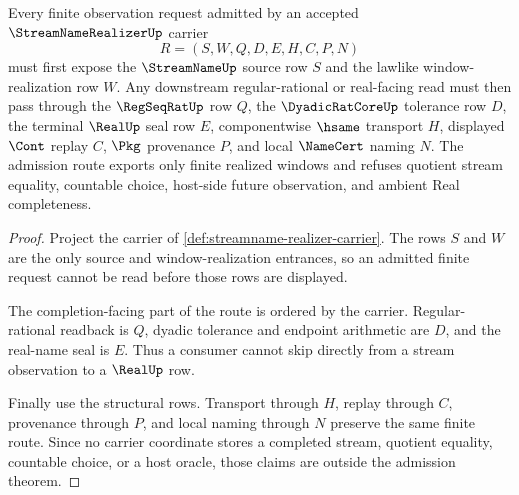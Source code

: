 \begin{theorem}
\label{thm:streamname-realizer-window-admission}
Every finite observation request admitted by an accepted $\StreamNameRealizerUp$ carrier
$$
R=(S,W,Q,D,E,H,C,P,N)
$$
must first expose the $\StreamNameUp$ source row $S$ and the lawlike window-realization row $W$. Any downstream regular-rational or real-facing read must then pass through the $\RegSeqRatUp$ row $Q$, the $\DyadicRatCoreUp$ tolerance row $D$, the terminal $\RealUp$ seal row $E$, componentwise $\hsame$ transport $H$, displayed $\Cont$ replay $C$, $\Pkg$ provenance $P$, and local $\NameCert$ naming $N$. The admission route exports only finite realized windows and refuses quotient stream equality, countable choice, host-side future observation, and ambient Real completeness.
\end{theorem}
\begin{proof}
Project the carrier of \autoref{def:streamname-realizer-carrier}. The rows $S$ and $W$ are the only source and window-realization entrances, so an admitted finite request cannot be read before those rows are displayed.

The completion-facing part of the route is ordered by the carrier. Regular-rational readback is $Q$, dyadic tolerance and endpoint arithmetic are $D$, and the real-name seal is $E$. Thus a consumer cannot skip directly from a stream observation to a $\RealUp$ row.

Finally use the structural rows. Transport through $H$, replay through $C$, provenance through $P$, and local naming through $N$ preserve the same finite route. Since no carrier coordinate stores a completed stream, quotient equality, countable choice, or a host oracle, those claims are outside the admission theorem.
\end{proof}

